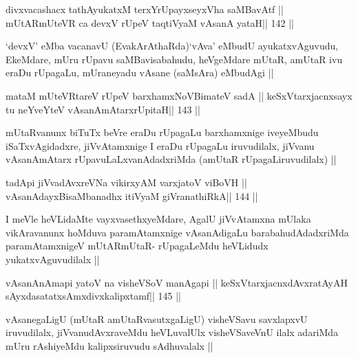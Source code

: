 \begin{shl}
divxvacashacx tathA\s yukatxM terxYrUpayxseyxVha saMBavAtf ||
mUtARmUteVR ca devxV rUpeV taqtiVyaM vAsanA yataH\hfill || 142 ||
\end{shl}

\begin{artha}
`devxV' eMba vacanavU (EvakArAthaRda)`vAva' eMbudU ayukatxvAguvudu,
  EkeMdare, mUru rUpavu saMBavisabahudu, heVgeMdare mUtaR, amUtaR ivu
  eraDu rUpagaLu, mUraneyadu vAsane (saMsAra) eMbudAgi ||
\end{artha}



\begin{shl}
mataM mUteVRtareV rUpeV barxhamxNoV\s BimateV sadA ||
keSxVtarxjacnxsayx tu neYveYteV vAsanAmAtarxrUpitaH\hfill || 143 ||
\end{shl}

\begin{artha}
mUtaRvanunx biTuTx beVre eraDu rUpagaLu barxhamxnige iveyeMbudu
iSaTxvAgidadxre, jiVvAtamxnige I eraDu rUpagaLu iruvudilalx, jiVvanu
vAsanAmAtarx rUpavuLaLxvanAdadxriMda (amUtaR rUpagaLiruvudilalx) ||
\end{artha}

\begin{shl}
tadA\s pi jiVvadAvxreVNa vikirxyAM varxjatoV viBoVH ||
vAsanAdayxBisaMbanadhx itiVyaM giVranathiRkA\hfill || 144 ||
\end{shl}

\begin{artha}
I meVle heVLidaMte vayxvasethxyeMdare, AgalU jiVvAtamxna mUlaka
vikAravanunx hoMduva paramAtamxnige vAsanAdigaLu barabahudAdadxriMda
paramAtamxnigeV mUtARmUtaR- rUpagaLeMdu heVLidudx yukatxvAguvudilalx
||
\end{artha}



\begin{shl}
vAsanAnAmapi yatoV na visheVSoV manAgapi ||
keSxVtarxjacnxdAvxratAyAH sAyxdasatatxsAmxdivxkalipxtamf\hfill || 145 ||
\end{shl}

\begin{artha}
vAsanegaLigU (mUtaR amUtaRvasutxgaLigU) visheVSavu savxlapxvU
iruvudilalx, jiVvanudAvxraveMdu heVLuvalUlx visheVSaveVnU ilalx
adariMda mUru rAshiyeMdu kalipxsiruvudu sAdhuvalalx ||
\end{artha}

